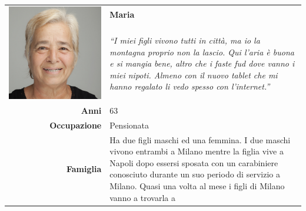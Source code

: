 \begin{table}[H]
	\begin{centering}
	\begin{tabular} { | r  p{10cm} | }
		\hline
		\multirow{2}{*}{
			\begin{minipage}{.18 \textheight}
				\vspace{0.1in}
				\includegraphics[width=\linewidth]{img/personas/maria.png}
			\end{minipage}
		}
	 	& \vspace{0.1 in}\Large\textbf{Maria} \\ 
		& \vspace{0.1 in}\large{\emph{``I miei figli vivono tutti in
città, ma io la montagna proprio non la lascio. Qui l'aria è buona e si
mangia bene, altro che i faste fud dove vanno i miei nipoti. Almeno con
il nuovo tablet che mi hanno regalato li vedo spesso con l'internet.''}}\\[8ex] 
		\hline
		\textbf{Anni} & 63 \\ \hline
		\textbf{Occupazione} & Pensionata \\ \hline
		\textbf{Famiglia} & Ha due figli maschi ed una femmina. I due
maschi vivono entrambi a Milano mentre la figlia vive a Napoli dopo
essersi sposata con un carabiniere conosciuto durante un suo periodo di servizio a
Milano. Quasi una volta al mese i figli di Milano vanno a trovarla a

\end{tabular}
\end{centering}
\end{table}
